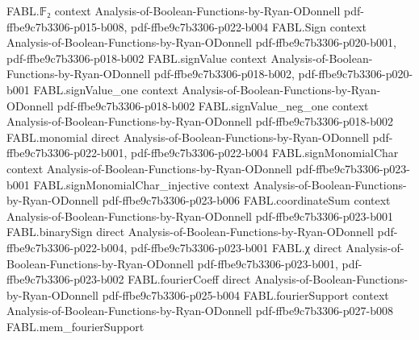 \begin{theorem}
\label{FABL.uniformInner_subsetDensity_domainTranslate_eq_sum}
\leanok
{}
\proofstep
  {FABL.𝔽₂}
  {context}
  {Analysis-of-Boolean-Functions-by-Ryan-ODonnell}
  {pdf-ffbe9c7b3306-p015-b008,
    pdf-ffbe9c7b3306-p022-b004}
\proofstep
  {FABL.Sign}
  {context}
  {Analysis-of-Boolean-Functions-by-Ryan-ODonnell}
  {pdf-ffbe9c7b3306-p020-b001,
    pdf-ffbe9c7b3306-p018-b002}
\proofstep
  {FABL.signValue}
  {context}
  {Analysis-of-Boolean-Functions-by-Ryan-ODonnell}
  {pdf-ffbe9c7b3306-p018-b002,
    pdf-ffbe9c7b3306-p020-b001}
\proofstep
  {FABL.signValue_one}
  {context}
  {Analysis-of-Boolean-Functions-by-Ryan-ODonnell}
  {pdf-ffbe9c7b3306-p018-b002}
\proofstep
  {FABL.signValue_neg_one}
  {context}
  {Analysis-of-Boolean-Functions-by-Ryan-ODonnell}
  {pdf-ffbe9c7b3306-p018-b002}
\proofstep
  {FABL.monomial}
  {direct}
  {Analysis-of-Boolean-Functions-by-Ryan-ODonnell}
  {pdf-ffbe9c7b3306-p022-b001,
    pdf-ffbe9c7b3306-p022-b004}
\proofstep
  {FABL.signMonomialChar}
  {context}
  {Analysis-of-Boolean-Functions-by-Ryan-ODonnell}
  {pdf-ffbe9c7b3306-p023-b001}
\proofstep
  {FABL.signMonomialChar_injective}
  {context}
  {Analysis-of-Boolean-Functions-by-Ryan-ODonnell}
  {pdf-ffbe9c7b3306-p023-b006}
\proofstep
  {FABL.coordinateSum}
  {context}
  {Analysis-of-Boolean-Functions-by-Ryan-ODonnell}
  {pdf-ffbe9c7b3306-p023-b001}
\proofstep
  {FABL.binarySign}
  {direct}
  {Analysis-of-Boolean-Functions-by-Ryan-ODonnell}
  {pdf-ffbe9c7b3306-p022-b004,
    pdf-ffbe9c7b3306-p023-b001}
\proofstep
  {FABL.χ}
  {direct}
  {Analysis-of-Boolean-Functions-by-Ryan-ODonnell}
  {pdf-ffbe9c7b3306-p023-b001,
    pdf-ffbe9c7b3306-p023-b002}
\proofstep
  {FABL.fourierCoeff}
  {direct}
  {Analysis-of-Boolean-Functions-by-Ryan-ODonnell}
  {pdf-ffbe9c7b3306-p025-b004}
\proofstep
  {FABL.fourierSupport}
  {context}
  {Analysis-of-Boolean-Functions-by-Ryan-ODonnell}
  {pdf-ffbe9c7b3306-p027-b008}
\proofstep
  {FABL.mem_fourierSupport}

\end{theorem}
